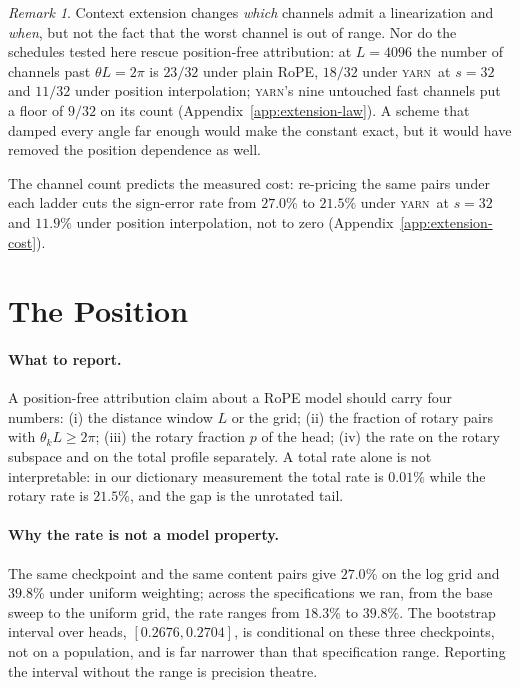 \documentclass{article}
\theoremstyle{plain}
\theoremstyle{remark}
\newtheorem{remark}[theorem]{Remark}
\newcommand{\yarn}{\textsc{yarn}}
\begin{document}
\begin{remark}
Context extension changes \emph{which} channels admit a linearization and
\emph{when}, but not the fact that the worst channel is out of range. Nor do the
schedules tested here rescue position-free attribution: at $L=4096$ the number
of channels past $\theta L=2\pi$ is $23/32$ under plain RoPE, $18/32$ under
\yarn\ at $s=32$ and $11/32$ under position interpolation; \yarn's nine
untouched fast channels put a floor of $9/32$ on its count (Appendix~\ref{app:extension-law}).
A scheme that damped every angle far enough would make the constant exact, but
it would have removed the position dependence as well.
\end{remark}

The channel count predicts the measured cost: re-pricing the same pairs under
each ladder cuts the sign-error rate from $27.0\%$ to $21.5\%$ under \yarn\ at
$s=32$ and $11.9\%$ under position interpolation, not to zero
(Appendix~\ref{app:extension-cost}).

\section{The Position}
\label{sec:position}

\paragraph{What to report.} A position-free attribution claim about a RoPE
model should carry four numbers: (i) the distance window $L$ or the grid;
(ii) the fraction of rotary pairs with $\theta_k L\ge2\pi$; (iii) the rotary
fraction $p$ of the head; (iv) the rate on the rotary subspace and on the total
profile separately. A total rate alone is not interpretable: in our dictionary
measurement the total rate is $0.01\%$ while the rotary rate is $21.5\%$, and
the gap is the unrotated tail.

\paragraph{Why the rate is not a model property.} The same checkpoint and the
same content pairs give $27.0\%$ on the log grid and $39.8\%$ under uniform
weighting; across the specifications we ran, from the base sweep to the
uniform grid, the rate ranges from $18.3\%$ to $39.8\%$. The bootstrap interval
over heads, $[0.2676,0.2704]$, is conditional on these three checkpoints, not on
a population, and is far narrower than that specification range. Reporting the
interval without the range is precision theatre.
\end{document}
